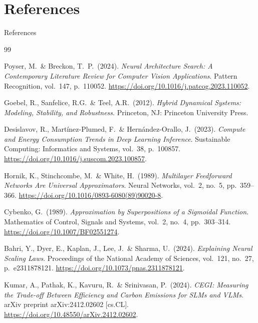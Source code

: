 \section{References}

\begin{frame}[allowframebreaks=0.88]{References}
  \fontsize{7.2}{8.8}\selectfont
  \begin{thebibliography}{99}

  Poyser, M.\ \& Breckon, T.~P.\ (2024).
  \textit{Neural Architecture Search: A Contemporary Literature Review for
  Computer Vision Applications}.
  Pattern Recognition, vol.\ 147, p.\ 110052.
  \url{https://doi.org/10.1016/j.patcog.2023.110052}.

  Goebel, R., Sanfelice, R.G.\ \& Teel, A.R.\ (2012).
  \textit{Hybrid Dynamical Systems: Modeling, Stability, and Robustness}.
  Princeton, NJ: Princeton University Press.

  Desislavov, R., Mart\'inez-Plumed, F.\ \& Hern\'andez-Orallo, J.\ (2023).
  \textit{Compute and Energy Consumption Trends in Deep Learning Inference}.
  Sustainable Computing: Informatics and Systems, vol.\ 38, p.\ 100857.
  \url{https://doi.org/10.1016/j.suscom.2023.100857}.

  Hornik, K., Stinchcombe, M.\ \& White, H.\ (1989).
  \textit{Multilayer Feedforward Networks Are Universal Approximators}.
  Neural Networks, vol.\ 2, no.\ 5, pp.\ 359--366.
  \url{https://doi.org/10.1016/0893-6080(89)90020-8}.

  Cybenko, G.\ (1989).
  \textit{Approximation by Superpositions of a Sigmoidal Function}.
  Mathematics of Control, Signals and Systems, vol.\ 2, no.\ 4, pp.\ 303--314.
  \url{https://doi.org/10.1007/BF02551274}.

  Bahri, Y., Dyer, E., Kaplan, J., Lee, J.\ \& Sharma, U.\ (2024).
  \textit{Explaining Neural Scaling Laws}.
  Proceedings of the National Academy of Sciences, vol.\ 121, no.\ 27,
  p.\ e2311878121.
  \url{https://doi.org/10.1073/pnas.2311878121}.

  \framebreak

  Kumar, A., Pathak, K., Kavuru, R.\ \& Srinivasan, P.\ (2024).
  \textit{CEGI: Measuring the Trade-off Between Efficiency and Carbon
  Emissions for SLMs and VLMs}.
  arXiv preprint arXiv:2412.02602 [cs.CL].
  \url{https://doi.org/10.48550/arXiv.2412.02602}.


\end{thebibliography}
\end{frame}
